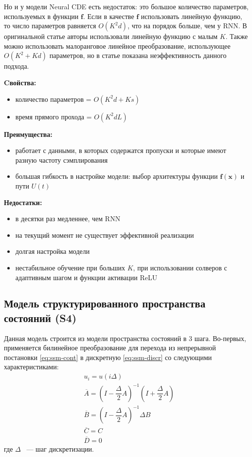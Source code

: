 \documentclass[a4paper, 12pt]{article}
\newcommand{\bx}{\mathbf{x}}
\newcommand{\bff}{\mathbf{f}}
\begin{document}
	Но и у модели Neural CDE есть недостаток: это большое количество параметров, используемых в функции $\bff$.
	Если в качестве $\bff$ использовать линейную функцию, то число параметров равняется $O(K^2d)$, что на порядок больше, чем у RNN.
	В оригинальной статье \citep{ncde} авторы использовали линейную функцию с малым $K$.
	Также можно использовать малоранговое линейное преобразование, использующее $O(K^2 + Kd)$ параметров, но в статье \citep{ncde} показана неэффективность данного подхода.
	
	\textbf{Cвойства:}
	\begin{itemize}
		\item количество параметров = $O(K^2d + Ks)$
		\item время прямого прохода = $O(K^2dL)$
	\end{itemize}
	
	\textbf{Преимущества:}
	\begin{itemize}
		\item работает с данными, в которых содержатся пропуски и которые имеют разную частоту сэмплирования
		\item большая гибкость в настройке модели: выбор архитектуры функции $\bff(\bx)$ и пути $U(t)$
	\end{itemize}
	
	\textbf{Недостатки:}
	\begin{itemize}
		\item в десятки раз медленнее, чем RNN
		\item на текущий момент не существует эффективной реализации
		\item долгая настройка модели
		\item нестабильное обучение при больших $K$, при использовании солверов с адаптивным шагом и функции активации ReLU
	\end{itemize}

	\subsection{Модель структурированного пространства состояний (S4)}
	Данная модель строится из модели пространства состояний в 3 шага. Во-первых, применяется билинейное преобразование для перехода из непрерывной постановки \ref{eq:ssm-cont} в дискретную \ref{eq:ssm-discr} со следующими характеристиками:
	\begin{align*}
		&u_i = u(i\Delta) \\
		&\overline{A} = (I - \dfrac{\Delta}{2} A)^{-1} (I + \dfrac{\Delta}{2} A) \\
		&\overline{B} = (I - \dfrac{\Delta}{2} A)^{-1} \Delta B \\
		&\overline{C} = C \\
		&\overline{D} = 0
	\end{align*}
	где $\Delta$ ~--- шаг дискретизации.
	
\end{document}

